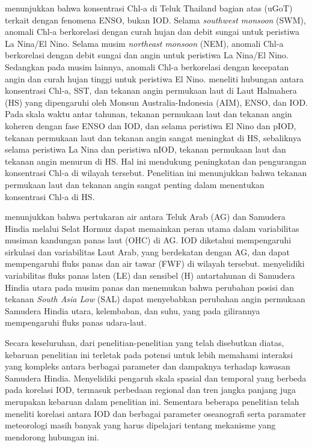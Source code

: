 \begin{spacing}{1.5}
	 menunjukkan bahwa konsentrasi Chl-a di Teluk Thailand bagian atas (uGoT) terkait dengan fenomena ENSO, bukan IOD. Selama \textit{southwest monsoon} (SWM), anomali Chl-a berkorelasi dengan curah hujan dan debit sungai untuk peristiwa La Nina/El Nino. Selama musim \textit{northeast monsoon} (NEM), anomali Chl-a berkorelasi dengan debit sungai dan angin untuk peristiwa La Nina/El Nino. Sedangkan pada musim lainnya, anomali Chl-a berkorelasi dengan kecepatan angin dan curah hujan tinggi untuk peristiwa El Nino.  meneliti hubungan antara konsentrasi Chl-a, SST, dan tekanan angin permukaan laut di Laut Halmahera (HS) yang dipengaruhi oleh Monsun Australia-Indonesia (AIM), ENSO, dan IOD. Pada skala waktu antar tahunan, tekanan permukaan laut dan tekanan angin koheren dengan fase ENSO dan IOD, dan selama peristiwa El Nino dan pIOD, tekanan permukaan laut dan tekanan angin sangat meningkat di HS, sebaliknya selama peristiwa La Nina dan peristiwa nIOD, tekanan permukaan laut dan tekanan angin menurun di HS. Hal ini mendukung peningkatan dan pengurangan konsentrasi Chl-a di wilayah tersebut. Penelitian ini menunjukkan bahwa tekanan permukaan laut dan tekanan angin sangat penting dalam menentukan konsentrasi Chl-a di HS.
	
	 menunjukkan bahwa pertukaran air antara Teluk Arab (AG) dan Samudera Hindia melalui Selat Hormuz dapat memainkan peran utama dalam variabilitas musiman kandungan panas laut (OHC) di AG. IOD diketahui mempengaruhi sirkulasi dan variabilitas Laut Arab, yang berdekatan dengan AG, dan dapat mempengaruhi fluks panas dan air tawar (FWF) di wilayah tersebut.   menyelidiki variabilitas fluks panas laten (LE) dan sensibel (H) antartahunan di Samudera Hindia utara pada musim panas dan menemukan bahwa perubahan posisi dan tekanan \textit{South Asia Low} (SAL) dapat menyebabkan perubahan angin permukaan Samudera Hindia utara, kelembaban, dan suhu, yang pada gilirannya mempengaruhi fluks panas udara-laut.
	
	Secara keseluruhan, dari penelitian-penelitian yang telah disebutkan diatas, kebaruan penelitian ini terletak pada potensi untuk lebih memahami interaksi yang kompleks antara berbagai parameter dan dampaknya terhadap kawasan Samudera Hindia. Menyelidiki pengaruh skala spasial dan temporal yang berbeda pada korelasi IOD, termasuk perbedaan regional dan tren jangka panjang juga merupakan kebaruan dalam penelitian ini. Sementara beberapa penelitian telah meneliti korelasi antara IOD dan berbagai parameter oseanografi serta paramater meteorologi masih banyak yang harus dipelajari tentang mekanisme yang mendorong hubungan ini.
	
\end{spacing}
\vspace{-1pc}
